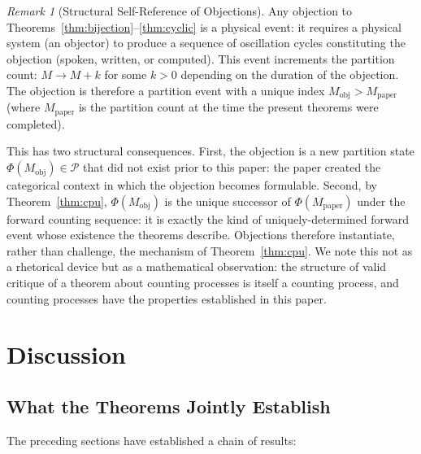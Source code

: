 \documentclass[twocolumn,10pt,a4paper]{article}
\theoremstyle{thmstyle}
\theoremstyle{definition}
\theoremstyle{remark}
\newtheorem{remark}[theorem]{Remark}
\newcommand{\Parts}{\mathcal{P}}
\newcommand{\PhiMap}{\varPhi}
\begin{document}
\begin{remark}[Structural Self-Reference of Objections]
\label{rem:self-ref}
Any objection to Theorems~\ref{thm:bijection}--\ref{thm:cyclic} is a physical event: it requires a physical system (an objector) to produce a sequence of oscillation cycles constituting the objection (spoken, written, or computed). This event increments the partition count: $M \to M + k$ for some $k > 0$ depending on the duration of the objection. The objection is therefore a partition event with a unique index $M_{\mathrm{obj}} > M_{\mathrm{paper}}$ (where $M_{\mathrm{paper}}$ is the partition count at the time the present theorems were completed).

This has two structural consequences. First, the objection is a new partition state $\PhiMap(M_{\mathrm{obj}}) \in \Parts$ that did not exist prior to this paper: the paper created the categorical context in which the objection becomes formulable. Second, by Theorem~\ref{thm:cpu}, $\PhiMap(M_{\mathrm{obj}})$ is the unique successor of $\PhiMap(M_{\mathrm{paper}})$ under the forward counting sequence: it is exactly the kind of uniquely-determined forward event whose existence the theorems describe. Objections therefore instantiate, rather than challenge, the mechanism of Theorem~\ref{thm:cpu}. We note this not as a rhetorical device but as a mathematical observation: the structure of valid critique of a theorem about counting processes is itself a counting process, and counting processes have the properties established in this paper.
\end{remark}

\section{Discussion}
\label{sec:discussion}

\subsection{What the Theorems Jointly Establish}

The preceding sections have established a chain of results:
\end{document}
